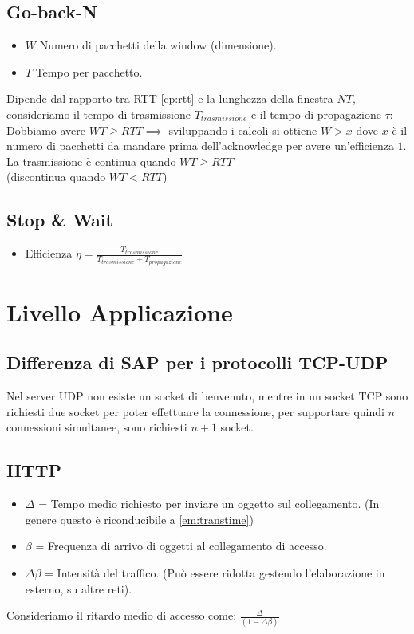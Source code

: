 \documentclass[a4paper]{report}
\begin{document}
{	\section{Go-back-N}
	\begin{itemize}
		\item $W$ Numero di pacchetti della window (dimensione).
		\item $T$ Tempo per pacchetto.
	\end{itemize}
	Dipende dal rapporto tra RTT \ref{cp:rtt} e la lunghezza della finestra $NT$, consideriamo il tempo di trasmissione $T_{trasmissione}$ e il tempo di propagazione $\tau$:\\
	Dobbiamo avere $WT \geq RTT \implies$ sviluppando i calcoli si ottiene $W>x$ dove $x$ è il numero di pacchetti da mandare prima dell'acknowledge per avere un'efficienza $1$. \\
	La trasmissione è continua quando $WT \geq RTT$ \\ (discontinua quando $WT < RTT$)
	\section{Stop \& Wait}
	\begin{itemize}
		\item Efficienza $\eta = \frac{T_{trasmissione}}{T_{trasmissione} + T_{propagazione}}$
	\end{itemize}
	\chapter{Livello Applicazione}
	\section{Differenza di SAP per i protocolli TCP-UDP}
	Nel server UDP non esiste un socket di benvenuto, mentre in un socket TCP sono richiesti due socket per poter effettuare la connessione, per supportare quindi $n$ connessioni simultanee, sono richiesti $n + 1$ socket.
	\section{HTTP}
	\begin{itemize}
		\item $\Delta$ = Tempo medio richiesto per inviare un oggetto sul collegamento. (In genere questo è riconducibile a \ref{em:transtime})
		\item $\beta$ = Frequenza di arrivo di oggetti al collegamento di accesso.
		\item $\Delta\beta$ = Intensità del traffico. (Può essere ridotta gestendo l'elaborazione in esterno, su altre reti).
	\end{itemize}
	Consideriamo il ritardo medio di accesso come:
	$\frac{\Delta}{(1 - \Delta\beta)}$
}
\end{document}
